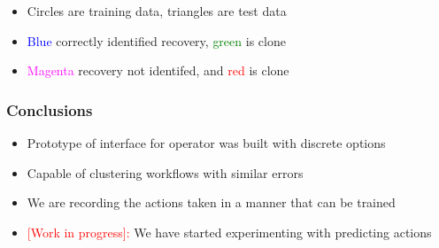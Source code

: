 \documentclass{beamer}
\newcommand{\beginbackup}{
  \newcounter{framenumbervorappendix}
  \setcounter{framenumbervorappendix}{\value{framenumber}}
}
\newcommand{\backupend}{
  \addtocounter{framenumbervorappendix}{-\value{framenumber}}
  \addtocounter{framenumber}{\value{framenumbervorappendix}}
}
\begin{document}
\begin{frame}
  {\small
  \begin{itemize}
  \item Circles are training data, triangles are test data
  \item \textcolor{blue}{Blue} correctly identified recovery, \textcolor{green}{green} is clone
  \item \textcolor{magenta}{Magenta} recovery not identifed, and \textcolor{red}{red} is clone
  \end{itemize}
  }

\end{frame}

\begin{frame}
  \frametitle{Conclusions}

  \begin{itemize}
  \item Prototype of interface for operator was built with discrete options
  \item Capable of clustering workflows with similar errors
  \item We are recording the actions taken in a manner that can be trained
  \item \textcolor{red}{[Work in progress]:}
    We have started experimenting with predicting actions
  \end{itemize}
\end{frame}

%
%
\end{document}
